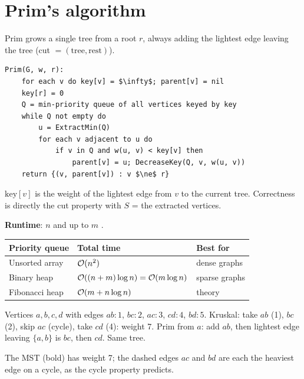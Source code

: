 \section{Prim's algorithm}
Prim grows a single tree from a root $r$, always adding the lightest edge leaving the tree (cut $=(\text{tree},\text{rest})$).
\begin{lstlisting}[style=pseudo]
Prim(G, w, r):
    for each v do key[v] = $\infty$; parent[v] = nil
    key[r] = 0
    Q = min-priority queue of all vertices keyed by key
    while Q not empty do
        u = ExtractMin(Q)
        for each v adjacent to u do
            if v in Q and w(u, v) < key[v] then
                parent[v] = u; DecreaseKey(Q, v, w(u, v))
    return {(v, parent[v]) : v $\ne$ r}
\end{lstlisting}
$\mathrm{key}[v]$ is the weight of the lightest edge from $v$ to the current tree. Correctness is directly the cut property with $S$ = the extracted vertices.

\textbf{Runtime}: $n$  and up to $m$ .
\begin{center}
\begin{tabular}{lll}
\toprule
Priority queue & Total time & Best for \\
\midrule
Unsorted array & $\mathcal{O}(n^2)$ & dense graphs \\
Binary heap & $\mathcal{O}((n+m)\log n)=\mathcal{O}(m\log n)$ & sparse graphs \\
Fibonacci heap & $\mathcal{O}(m+n\log n)$ & theory \\
\bottomrule
\end{tabular}
\end{center}

\begin{example}
Vertices $a,b,c,d$ with edges $ab{:}1$, $bc{:}2$, $ac{:}3$, $cd{:}4$, $bd{:}5$.
Kruskal: take $ab$ (1), $bc$ (2), skip $ac$ (cycle), take $cd$ (4): weight 7.
Prim from $a$: add $ab$, then lightest edge leaving $\{a,b\}$ is $bc$, then $cd$. Same tree.
\end{example}

\begin{center}
\end{center}
The MST (bold) has weight 7; the dashed edges $ac$ and $bd$ are each the
heaviest edge on a cycle, as the cycle property predicts.

